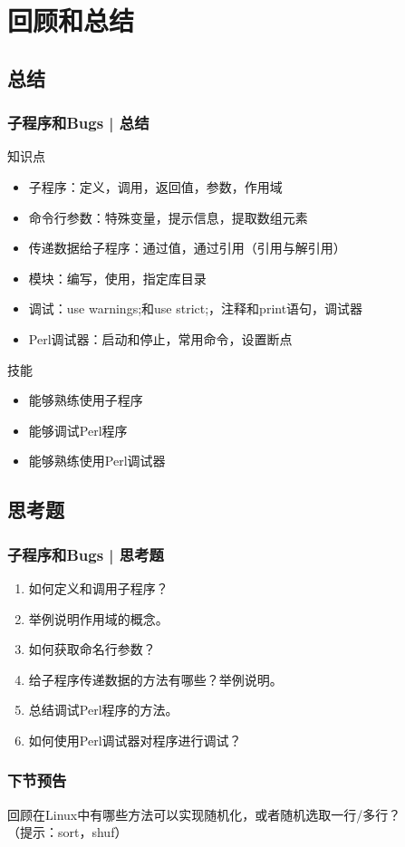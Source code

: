 \section{回顾和总结}
\subsection{总结}
\begin{frame}
  \frametitle{子程序和Bugs | 总结}
  \begin{block}{知识点}
    \begin{itemize}
      \item 子程序：定义，调用，返回值，参数，作用域
      \item 命令行参数：特殊变量，提示信息，提取数组元素
      \item 传递数据给子程序：通过值，通过引用（引用与解引用）
      \item 模块：编写，使用，指定库目录
      \item 调试：use warnings;和use strict;，注释和print语句，调试器
      \item Perl调试器：启动和停止，常用命令，设置断点
    \end{itemize}
  \end{block}
  \pause
  \begin{block}{技能}
    \begin{itemize}
      \item 能够熟练使用子程序
      \item 能够调试Perl程序
      \item 能够熟练使用Perl调试器
    \end{itemize}
  \end{block}
\end{frame}

\subsection{思考题}
\begin{frame}
  \frametitle{子程序和Bugs | 思考题}
  \begin{enumerate}
    \item 如何定义和调用子程序？
    \item 举例说明作用域的概念。
    \item 如何获取命名行参数？
    \item 给子程序传递数据的方法有哪些？举例说明。
    \item 总结调试Perl程序的方法。
    \item 如何使用Perl调试器对程序进行调试？
  \end{enumerate}
\end{frame}

\begin{frame}
  \frametitle{下节预告}
  回顾在Linux中有哪些方法可以实现随机化，或者随机选取一行/多行？\\
  （提示：sort，shuf）
\end{frame}


